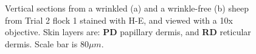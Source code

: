 %

\begin{figure}[!h]
\centering
\captionsetup{width=0.7\textwidth}
  \caption{Vertical sections from a wrinkled (a) and a wrinkle-free (b)  sheep from Trial 2 flock 1 stained with H-E, and viewed with a 10x objective. Skin layers are: {\bf PD} papillary dermis, and {\bf RD} reticular dermis. Scale bar is $80\mu m$.}
\vfill
  \label{fig:he10x}
\end{figure}

%

